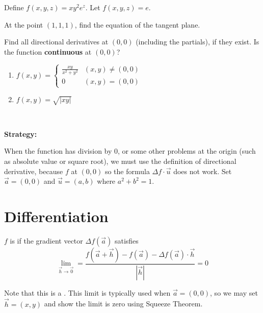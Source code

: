 \documentclass[11pt,fleqn]{book} %
\begin{document}
\begin{exercise}
    Define $f(x, y, z) = xy^2e^z$. Let $f(x, y, z) = e$. 

    At the point $(1, 1, 1)$, find the equation of the tangent plane.
\end{exercise}

\begin{exercise}
    Find all directional derivatives at $(0, 0)$ (including the partials), if they exist. Is the function \textbf{continuous} at $(0, 0)$?
    \begin{enumerate}[label=\alph*)]
        \item 
        $f(x, y) = \begin{cases}
            \frac{xy}{x^2 + y^2} & (x, y) \neq (0, 0) \\
            0                    & (x, y) = (0, 0)
        \end{cases}$

        \item $f(x, y) = \sqrt{|xy|}$
    \end{enumerate}

    {~~~}

    \textbf{Strategy:}

    When the function has division by $0$, or some other problems at the origin (such as absolute value or square root), we must use the definition of directional derivative, because $f$  at $(0, 0)$ so the formula $\Delta f \cdot \vec{u}$ does not work. Set $\vec{a} = (0, 0)$ and $\vec{u} = (a, b)$ where $a^2 + b^2 = 1$. 
\end{exercise}

\section{Differentiation}

\begin{definition}[Differentiable]
    $f$ is  if the gradient vector $\Delta f(\vec{a})$ satisfies $$\lim_{\vec{h} \to \vec{0}} = \frac{f(\vec{a} + \vec{h}) - f(\vec{a}) - \Delta f(\vec{a}) \cdot \vec{h}}{| \vec{h} |} = 0$$
\end{definition}

Note that this is a . This limit is typically used when $\vec{a} = (0, 0)$, so we may set $\vec{h} = (x, y)$ and show the limit is zero using Squeeze Theorem.

{~~~}
\end{document}
